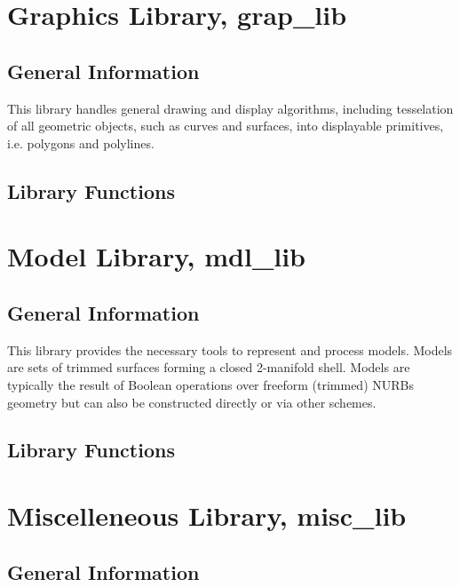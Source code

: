 {%
\chapter{Graphics Library, grap\_lib}

\section{General Information}

This library handles general drawing and display algorithms, including
tesselation of all geometric objects, such as curves and surfaces, into
displayable primitives, i.e. polygons and polylines.

\section{Library Functions}


\chapter{Model Library, mdl\_lib}

\section{General Information}

This library provides the necessary tools to represent and process
models.  Models are sets of trimmed surfaces forming a closed
2-manifold shell.  Models are typically the result of Boolean operations
over freeform (trimmed) NURBs geometry but can also be constructed
directly or via other schemes.

\section{Library Functions}


\chapter{Miscelleneous Library, misc\_lib}

\section{General Information}

}
